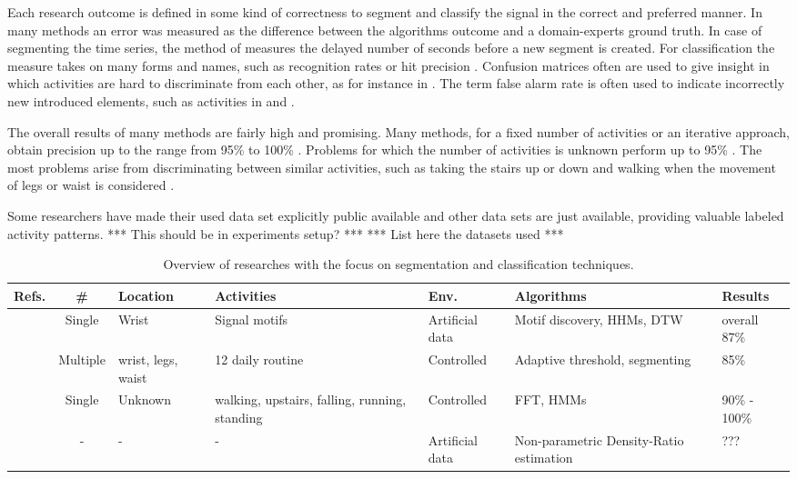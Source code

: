 Each research outcome is defined in some kind of correctness to segment and classify the signal in the correct and preferred manner.
In many methods an error was measured as the difference between the algorithms outcome and a domain-experts ground truth.
In case of segmenting the time series, the method of \cite{guenterberg2009automatic} measures the delayed number of seconds before a new segment is created.
For classification the measure takes on many forms and names, such as recognition rates \cite{bao2004activity} or hit precision \cite{ahmed2012non}.
Confusion matrices often are used to give insight in which activities are hard to discriminate from each other, as for instance in \cite{kwapisz2011activity}.
The term false alarm rate is often used to indicate incorrectly new introduced elements, such as activities in \cite{ahmed2012non} and \cite{kawahara2009change}.

The overall results of many methods are fairly high and promising.
Many methods, for a fixed number of activities or an iterative approach, obtain precision up to the range from 95\% to 100\% \cite{minnen2006discovering, shi2009towards, kwapisz2011activity, duque2012offline, he2009activity, lee2178physical, siirtola2012recognizing}.
Problems for which the number of activities is unknown perform up to 95\% \cite{ahmed2012non, barbivc2004segmenting}.
The most problems arise from discriminating between similar activities, such as taking the stairs up or down and walking when the movement of legs or waist is considered \cite{kwapisz2011activity, duque2012offline}.

Some researchers have made their used data set explicitly public available and other data sets are just available, providing valuable labeled activity patterns. *** This should be in experiments setup? ***
*** List here the datasets used ***

\begin{table}
\tiny
\centering
\begin{tabular}{ | l | c | p{1.5cm} | p{1.5cm} | p{1.5cm} | p{2.5cm} | p{3cm} | }
  \hline
  Refs. & \# & Location & Activities & Env. & Algorithms & Results \\
  \hline
  \cite{minnen2006discovering} & Single & Wrist & Signal motifs & Artificial data & Motif discovery, HHMs, DTW & overall 87\% \\
  \hline
  \cite{guenterberg2009automatic} & Multiple & wrist, legs, waist & 12 daily routine & Controlled & Adaptive threshold, segmenting & 85\% \\
  \hline
  \cite{shi2009towards} & Single & Unknown & walking, upstairs, falling, running, standing & Controlled & FFT, HMMs & 90\% - 100\% \\
  \hline
  \cite{kawahara2009change} & - & - & - & Artificial data & Non-parametric Density-Ratio estimation & ??? \\
  \hline
\end{tabular}
\caption{Overview of researches with the focus on segmentation and classification techniques.}
\label{table:papers_segmentation_classification}
\end{table}

